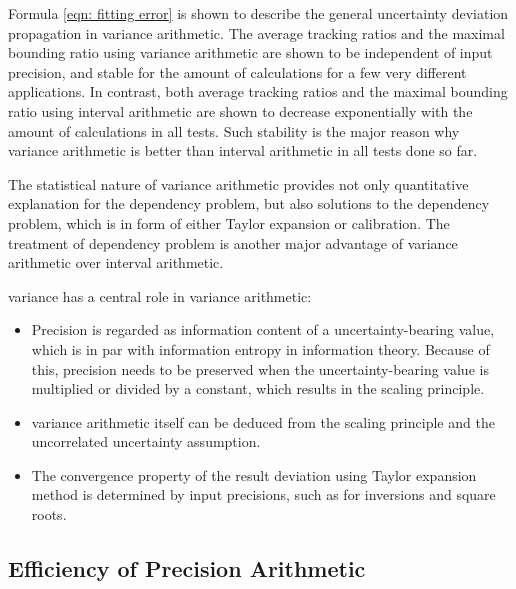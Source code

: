 \documentclass[twoside]{article}
\numberwithin{equation}{section}
\begin{document}
Formula \eqref{eqn: fitting error} is shown to describe the general uncertainty deviation propagation in variance arithmetic.  The average tracking ratios and the maximal bounding ratio using variance arithmetic are shown to be independent of input precision, and stable for the amount of calculations for a few very different applications.  In contrast, both average tracking ratios and the maximal bounding ratio using interval arithmetic are shown to decrease exponentially with the amount of calculations in all tests.  Such stability is the major reason why variance arithmetic is better than interval arithmetic in all tests done so far.  

The statistical nature of variance arithmetic provides not only quantitative explanation for the dependency problem, but also solutions to the dependency problem, which is in form of either Taylor expansion or calibration.  The treatment of dependency problem is another major advantage of variance arithmetic over interval arithmetic.

variance has a central role in variance arithmetic:
\begin{itemize}
\item Precision is regarded as information content of a uncertainty-bearing value, which is in par with information entropy in information theory.  Because of this, precision needs to be preserved when the uncertainty-bearing value is multiplied or divided by a constant, which results in the scaling principle.   
\item variance arithmetic itself can be deduced from the scaling principle and the uncorrelated uncertainty assumption.
\item The convergence property of the result deviation using Taylor expansion method is determined by input precisions, such as for inversions and square roots.
\end{itemize}

\subsection{Efficiency of Precision Arithmetic}
\end{document}
